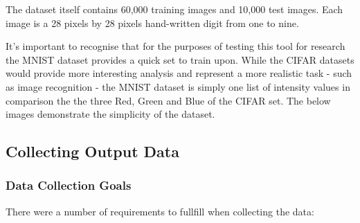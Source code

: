 \documentclass[a4paper,11pt,titlepage]{article}
\begin{document}
	The dataset itself contains 60,000 training images and 10,000 test images. Each image is a 28 pixels by 28 pixels hand-written digit from one to nine.
	\par 
	It's important to recognise that for the purposes of testing this tool for research the MNIST dataset provides a quick set to train upon. While the CIFAR datasets would provide more interesting analysis and represent a more realistic task - such as image recognition - the MNIST dataset is simply one list of intensity values in comparison the the three Red, Green and Blue of the CIFAR set. The below images demonstrate the simplicity of the dataset.

	\begin{figure}[H]
    			\centering	
    			\qquad
    			\caption{}%
    			\label{fig:mnist_four}
		\end{figure}

	\subsection{Collecting Output Data}
	
	\subsubsection{Data Collection Goals}
	\par
	There were a number of requirements to fullfill when collecting the data:
	
\end{document}
